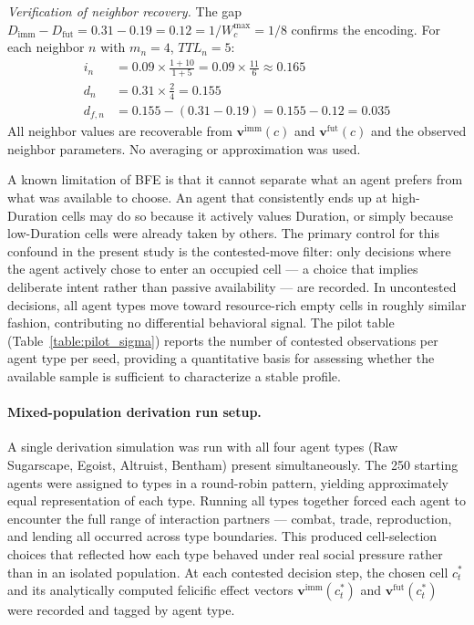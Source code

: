 \documentclass{icsthesis}
\begin{document}
\begin{mainmatter}
\noindent\textit{Verification of neighbor recovery.} The gap $D_{\mathrm{imm}} - D_{\mathrm{fut}} = 0.31 - 0.19 = 0.12 = 1/W_c^{\max} = 1/8$ confirms the encoding. For each neighbor $n$ with $m_n = 4$, $TTL_n = 5$:
\begin{align*}
i_n &= 0.09 \times \tfrac{1+10}{1+5} = 0.09 \times \tfrac{11}{6} \approx 0.165 \\
d_n &= 0.31 \times \tfrac{2}{4} = 0.155 \\
d_{f,n} &= 0.155 - (0.31 - 0.19) = 0.155 - 0.12 = 0.035
\end{align*}
All neighbor values are recoverable from $\mathbf{v}^{\mathrm{imm}}(c)$ and $\mathbf{v}^{\mathrm{fut}}(c)$ and the observed neighbor parameters. No averaging or approximation was used.

A known limitation of BFE is that it cannot separate what an agent prefers from what was available to choose. An agent that consistently ends up at high-Duration cells may do so because it actively values Duration, or simply because low-Duration cells were already taken by others. The primary control for this confound in the present study is the contested-move filter: only decisions where the agent actively chose to enter an occupied cell --- a choice that implies deliberate intent rather than passive availability --- are recorded. In uncontested decisions, all agent types move toward resource-rich empty cells in roughly similar fashion, contributing no differential behavioral signal. The pilot table (Table~\ref{table:pilot_sigma}) reports the number of contested observations per agent type per seed, providing a quantitative basis for assessing whether the available sample is sufficient to characterize a stable profile.

\paragraph{Mixed-population derivation run setup.}
A single derivation simulation was run with all four agent types (Raw Sugarscape, Egoist, Altruist, Bentham) present simultaneously. The 250 starting agents were assigned to types in a round-robin pattern, yielding approximately equal representation of each type. Running all types together forced each agent to encounter the full range of interaction partners --- combat, trade, reproduction, and lending all occurred across type boundaries. This produced cell-selection choices that reflected how each type behaved under real social pressure rather than in an isolated population. At each contested decision step, the chosen cell $c_t^*$ and its analytically computed felicific effect vectors $\mathbf{v}^{\mathrm{imm}}(c_t^*)$ and $\mathbf{v}^{\mathrm{fut}}(c_t^*)$ were recorded and tagged by agent type.


\end{mainmatter}
\end{document}
